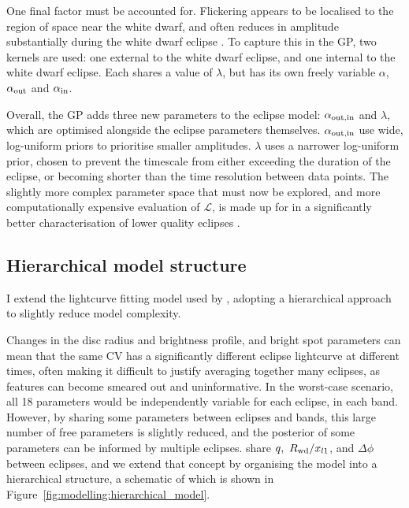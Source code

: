 One final factor must be accounted for. Flickering appears to be localised to the region of space near the white dwarf, and often reduces in amplitude substantially during the white dwarf eclipse \citep{McAllister2017}.
To capture this in the GP, two kernels are used: one external to the white dwarf eclipse, and one internal to the white dwarf eclipse. Each shares a value of $\lambda$, but has its own freely variable $\alpha$, $\alpha_{\rm out}$ and $\alpha_{\rm in}$.

Overall, the GP adds three new parameters to the eclipse model: $\alpha_{\rm out, in}$ and $\lambda$, which are optimised alongside the eclipse parameters themselves. $\alpha_{\rm out, in}$ use wide, log-uniform priors to prioritise smaller amplitudes. $\lambda$ uses a narrower log-uniform prior, chosen to prevent the timescale from either exceeding the duration of the eclipse, or becoming shorter than the time resolution between data points.
The slightly more complex parameter space that must now be explored, and more computationally expensive evaluation of $\mathcal{L}$, is made up for in a significantly better characterisation of lower quality eclipses \citep{McAllister2017}.



\subsection{Hierarchical model structure}
\label{sect:modelling:optimising eclipse model parameters}

I extend the lightcurve fitting model used by \citet{McAllister2019}, adopting a hierarchical approach to slightly reduce model complexity.

Changes in the disc radius and brightness profile, and bright spot parameters can mean that the same CV has a significantly different eclipse lightcurve at different times, often making it difficult to justify averaging together many eclipses, as features can become smeared out and uninformative. In the worst-case scenario, all 18 parameters would be independently variable for each eclipse, in each band. However, by sharing some parameters between eclipses and bands, this large number of free parameters is slightly reduced, and the posterior of some parameters can be informed by multiple eclipses. \citet{McAllister2017} share $q,\ R_{\rm wd} / x_{l1}$, and $\Delta\phi$ between eclipses, and we extend that concept by organising the model into a hierarchical structure, a schematic of which is shown in Figure~\ref{fig:modelling:hierarchical_model}.

